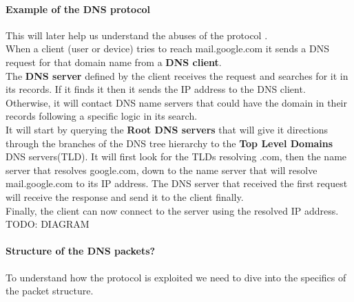 \paragraph{Example of the DNS protocol \cite{dns2}\cite{dns3}} This will later help us understand the abuses of the protocol .\\
When a client (user or device) tries to reach mail.google.com it sends a DNS request for that domain name from a \textbf{DNS client}.\\
The \textbf{DNS server} defined by the client receives the request and searches for it in its records. If it finds it then it sends the IP address to the DNS client. Otherwise, it will contact DNS name servers that could have the domain in their records following a specific logic in its search.\\
It will start by querying the \textbf{Root DNS servers} that will give it directions through the branches of the DNS tree hierarchy to the \textbf{Top Level Domains} DNS servers(TLD). It will first look for the TLDs resolving .com, then the name server that resolves google.com, down to the name server that will resolve mail.google.com to its IP address. The DNS server that received the first request will receive the response and send it to the client finally.\\
Finally, the client can now connect to the server using the resolved IP address.\\
TODO: DIAGRAM 

\paragraph{Structure of the DNS packets?} To understand how the protocol is exploited we need to dive into the specifics of the packet structure.

